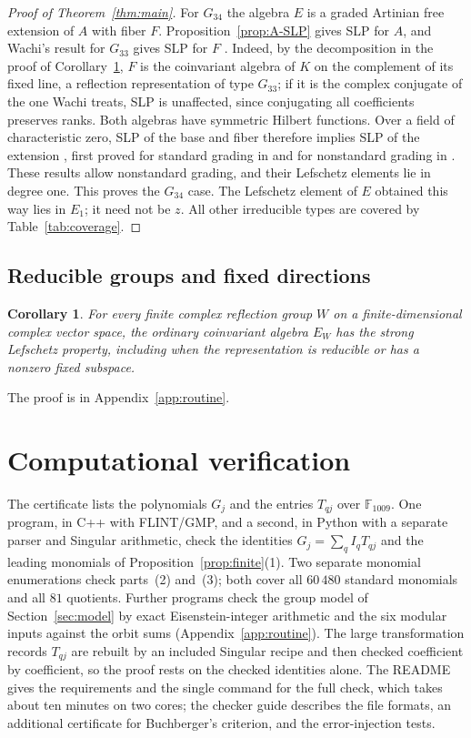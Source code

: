 \documentclass[11pt]{article}
\newtheorem{corollary}[theorem]{Corollary}
\theoremstyle{definition}
\newcommand{\F}{\mathbb F}
\begin{document}
\begin{proof}[Proof of Theorem~\ref{thm:main}]
For $G_{34}$ the algebra $E$ is a graded Artinian free extension of
$A$ with fiber $F$. Proposition~\ref{prop:A-SLP} gives SLP for $A$,
and Wachi's result for $G_{33}$ gives SLP for $F$
\cite{Wachi25,WachiCode}. Indeed, by the decomposition in the proof of
Corollary~\ref{cor:all}, $F$ is the coinvariant algebra of $K$ on the
complement of its fixed line, a reflection representation of type
$G_{33}$; if it is the complex conjugate of the one Wachi treats, SLP is
unaffected, since conjugating all coefficients preserves ranks. Both
algebras have symmetric Hilbert functions.
Over a field of characteristic zero, SLP of the base and fiber
therefore implies SLP of the extension
\cite[Proposition~2.22]{MCCM}, first proved for standard grading in
\cite{HW03,HW03e} and for nonstandard grading in \cite[Theorem~6.1]{HW07}. These results allow nonstandard grading,
and their Lefschetz elements lie in degree one. This proves the
$G_{34}$ case. The Lefschetz element of $E$ obtained this way lies in
$E_1$; it need not be $z$.
All other irreducible types are covered by Table~\ref{tab:coverage}.
\end{proof}

\subsection*{Reducible groups and fixed directions}
\begin{corollary}\label{cor:all}
For every finite complex reflection group $W$ on a finite-dimensional
complex vector space, the ordinary coinvariant algebra $E_W$ has the
strong Lefschetz property, including when the representation is
reducible or has a nonzero fixed subspace.
\end{corollary}
The proof is in Appendix~\ref{app:routine}.

\section{Computational verification}\label{sec:trust}
The certificate lists the polynomials $G_j$ and the entries $T_{qj}$
over $\F_{1009}$. One program, in C++ with FLINT/GMP, and a second, in
Python with a separate parser and Singular arithmetic, check the
identities $G_j=\sum_qI_qT_{qj}$ and the leading monomials of
Proposition~\ref{prop:finite}(1). Two separate monomial enumerations
check parts~(2) and~(3); both cover all $60\,480$ standard monomials and
all $81$ quotients. Further programs check the group model of
Section~\ref{sec:model} by exact Eisenstein-integer arithmetic and the
six modular inputs against the orbit sums
(Appendix~\ref{app:routine}). The large transformation records $T_{qj}$
are rebuilt by an included Singular recipe and then checked coefficient
by coefficient, so the proof rests on the checked identities alone.
The README gives the requirements and the single command for the full
check, which takes about ten minutes on two cores; the checker guide describes the file formats, an
additional certificate for Buchberger's criterion, and the
error-injection tests.
\end{document}
